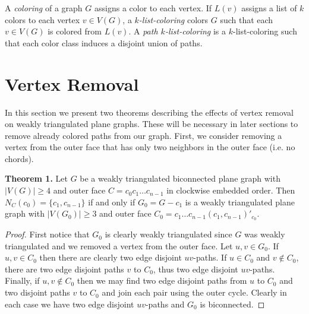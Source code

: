 \documentclass[12pt,a4paper]{article}
\begin{document}
\noindent A \emph{coloring} of a graph $G$ assigns a color to each vertex. If $L(v)$ assigns
a list of $k$ colors to each vertex $v\in V(G)$, a \emph{$k$-list-coloring} colors $G$ such
that each $v\in V(G)$ is colored from $L(v)$. A \emph{path $k$-list-coloring} is a $k$-list-coloring such that
each color class induces a disjoint union of paths.

\section{Vertex Removal}

In this section we present two theorems describing the effects of vertex removal on weakly triangulated plane
graphs. These will be necessary in later
sections to remove already colored paths from our graph. First, we consider removing a vertex
from the outer face that has only two neighbors in the outer face (i.e. no chords).\\

\begin{adjustwidth}{2em}{2em}
\noindent \textbf{Theorem 1.} Let $G$ be a weakly triangulated biconnected plane graph with $|V(G)|\ge 4$ and
outer face
$C=c_0c_1\ldots c_{n-1}$ in clockwise embedded order. Then $N_C(c_0)=\{c_{1},c_{n-1}\}$ if and only if
$G_0=G-c_1$ is a weakly triangulated plane graph with $|V(G_0)|\ge 3$ and outer face
$C_0=c_1\ldots c_{n-1}(c_{1},c_{n-1})'_{c_0}$.

\begin{proof}
First notice that $G_0$ is clearly weakly triangulated since $G$ was weakly triangulated and we removed a
vertex from the outer face.
Let $u,v\in G_0$. If $u,v\in C_0$ then there are clearly two edge disjoint $uv$-paths. If $u\in C_0$ and $v\not\in C_0$,
there are two edge disjoint paths $v$ to $C_0$, thus two edge disjoint $uv$-paths. Finally,
if $u,v\not\in C_0$ then we may find two edge disjoint paths from $u$ to $C_0$ and two disjoint paths $v$ to $C_0$ and
join each pair using the outer cycle.
Clearly in each case we have two edge disjoint $uv$-paths and $G_0$ is biconnected.
\end{proof}
\end{adjustwidth}
\end{document}
